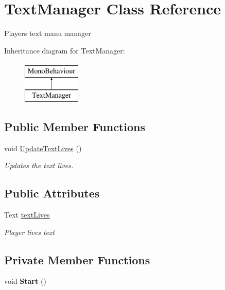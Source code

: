 \hypertarget{class_text_manager}{}\section{Text\+Manager Class Reference}
\label{class_text_manager}


Player\textquotesingle{}s text manu manager  


Inheritance diagram for Text\+Manager\+:\begin{figure}[H]
\begin{center}
\leavevmode
\includegraphics[height=2.000000cm]{class_text_manager}
\end{center}
\end{figure}
\subsection*{Public Member Functions}
\begin{DoxyCompactItemize}
\item 
void \mbox{\hyperlink{class_text_manager_a3bbadf652b27afb331e85866cc2b46d4}{Update\+Text\+Lives}} ()
\begin{DoxyCompactList}\small\item\em Updates the text lives. \end{DoxyCompactList}\end{DoxyCompactItemize}
\subsection*{Public Attributes}
\begin{DoxyCompactItemize}
\item 
Text \mbox{\hyperlink{class_text_manager_a8b12b74376f0b32cbef62f6b041e25f4}{text\+Lives}}
\begin{DoxyCompactList}\small\item\em Player lives text \end{DoxyCompactList}\end{DoxyCompactItemize}
\subsection*{Private Member Functions}
\begin{DoxyCompactItemize}
\item 
\mbox{\label{class_text_manager_a99feff090de2af779ed7f2319ebe29ac}} 
void {\bfseries Start} ()
\end{DoxyCompactItemize}


